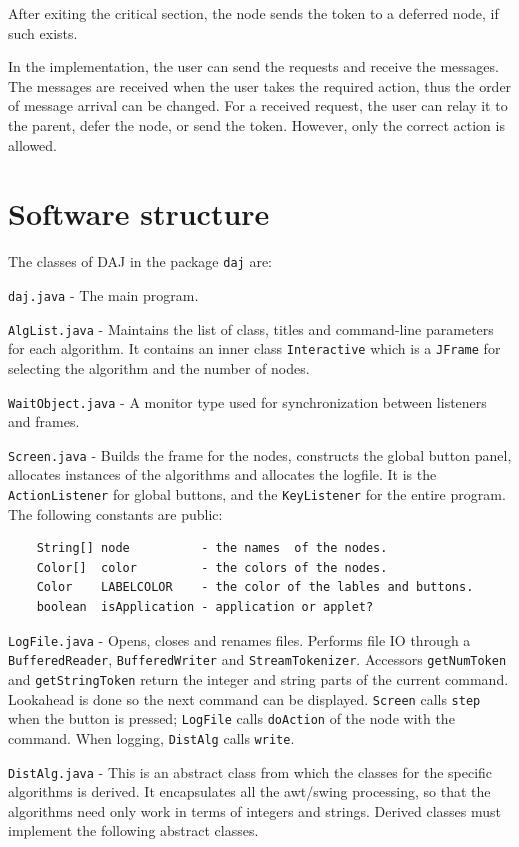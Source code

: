 \documentclass[11pt]{article}
\newcommand{\daj}{\textsc{DAJ}}
\newcommand{\p}[1]{\texttt{#1}}
\begin{document}
After exiting the critical section, the node sends the token to a
deferred node, if such exists.

In the implementation, the user can send the requests and receive the
messages. The messages are received when the user takes the required
action, thus the order of message arrival can be changed. For a
received request, the user can relay it to the parent, defer the node,
or send the token. However, only the correct action is allowed.

\section{Software structure}
The classes of \daj{} in the package \p{daj} are:

\p{daj.java} - The main program.

\p{AlgList.java} - Maintains the list of class, titles and
command-line parameters for each algorithm. It contains an inner
class \p{Interactive} which is a \p{JFrame} for selecting the
algorithm and the number of nodes.

\p{WaitObject.java} - A monitor type used for synchronization
between listeners and frames.

\p{Screen.java} - Builds the frame for the nodes, constructs the
global button panel, allocates instances of the algorithms and
allocates the logfile. It is the \p{ActionListener} for global
buttons, and the \p{KeyListener} for the entire program. The
following constants are public:

\begin{verbatim}
    String[] node          - the names  of the nodes.
    Color[]  color         - the colors of the nodes.
    Color    LABELCOLOR    - the color of the lables and buttons.
    boolean  isApplication - application or applet?
\end{verbatim}

\p{LogFile.java} - Opens, closes and renames files. Performs file
IO through a \p{BufferedReader}, \p{BufferedWriter} and
\p{StreamTokenizer}. Accessors \p{getNumToken} and
\p{getStringToken} return the integer and string parts of the
current command. Lookahead is done so the next command can be
displayed. \p{Screen} calls \p{step} when the button is pressed;
\p{LogFile} calls \p{doAction} of the node with the command.
When logging, \p{DistAlg} calls \p{write}.

\p{DistAlg.java} - This is an abstract class from which the
classes for the specific algorithms is derived. It encapsulates
all the awt/swing processing, so that the algorithms need only
work in terms of integers and strings. Derived classes must
implement the following abstract classes.
\end{document}
